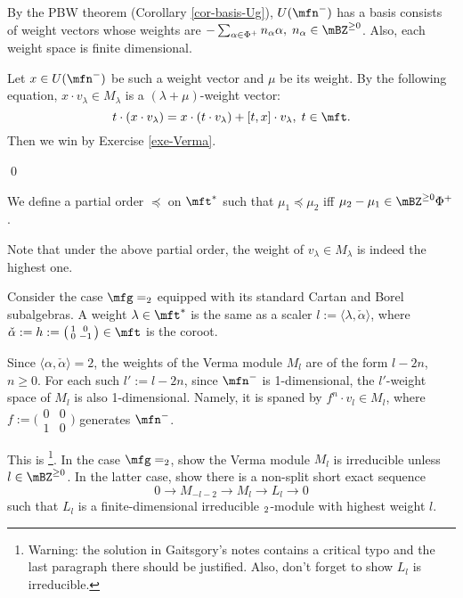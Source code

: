 	By the PBW theorem (Corollary \ref{cor-basis-Ug}), $U(\mfn^-)$ has a basis consists of weight vectors whose weights are $- \sum_{\alpha\in \Phi^+} n_\alpha \alpha,\; n_\alpha \in \mBZ^{\ge 0}$. Also, each weight space is finite dimensional.

	Let $x\in U(\mfn^-)$ be such a weight vector and $\mu$ be its weight. By the following equation, $x\cdot v_\lambda\in M_\lambda$ is a $(\lambda+\mu)$-weight vector:
	\[
		t\cdot (x\cdot v_\lambda) = x\cdot (t\cdot v_\lambda) + [t,x]\cdot v_\lambda,\; t\in \mft.
	\]
	Then we win by Exercise \ref{exe-Verma}.

\qed

\begin{defn}
	We define a partial order $\preceq$ on $\mft^*$ such that $\mu_1\preceq \mu_2$ iff $\mu_2-\mu_1 \in \mBZ^{\ge 0}\Phi^+$.
\end{defn}

Note that under the above partial order, the weight of $v_\lambda\in M_\lambda$ is indeed the highest one.


\begin{exam}
	Consider the case $\mfg=\sl_2$ equipped with its standard Cartan and Borel subalgebras. A weight $\lambda\in \mft^*$ is the same as a scaler $l:= \langle \lambda,\check \alpha\rangle $, where $ \check \alpha := h:= \big(\begin{smallmatrix} 1 & 0\\ 0 & -1\end{smallmatrix}\big)\in \mft$ is the coroot. 

	Since $\langle \alpha,\check \alpha\rangle =2$, the weights of the Verma module $M_l$ are of the form $l-2n$, $n\ge 0$. For each such $l':=l-2n$, since $\mfn^-$ is 1-dimensional, the $l'$-weight space of $M_l$ is also 1-dimensional. Namely, it is spaned by $f^n\cdot v_l\in M_l$, where $f:=  \big(\begin{smallmatrix} 0 & 0\\ 1 & 0\end{smallmatrix}\big)$ generates $\mfn^-$.

\end{exam}

\begin{exe}
	This is \footnote{Warning: the solution in Gaitsgory's notes contains a critical typo and the last paragraph there should be justified. Also, don't forget to show $L_l$ is irreducible.
	}. 
	In the case $\mfg=\sl_2$, show the Verma module $M_l$ is irreducible unless $l\in \mBZ^{\ge 0}$. In the latter case, show there is a non-split short exact sequence 
	\begin{equation} \label{eqn-sl2}
		0 \to M_{-l-2} \to M_l \to L_l \to 0
	\end{equation}
	such that $L_l$ is a finite-dimensional irreducible $\sl_2$-module with highest weight $l$.
\end{exe}

